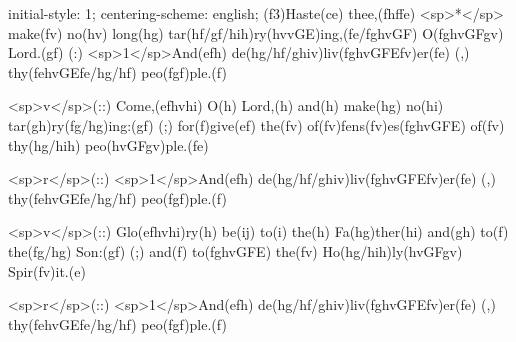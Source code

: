 initial-style: 1;
centering-scheme: english;
(f3)Haste(ce) thee,(fhffe) <sp>*</sp> make(fv) no(hv) long(hg) tar(hf/gf/hih)ry(hvvGE)ing,(fe/fghvGF) O(fghvGFgv) Lord.(gf) (:) <sp>1</sp>And(efh) de(hg/hf/ghiv)liv(fghvGFEfv)er(fe) (,) thy(fehvGEfe/hg/hf) peo(fgf)ple.(f) 

<sp>v</sp>(::) Come,(efhvhi) O(h) Lord,(h) and(h) make(hg) no(hi) tar(gh)ry(fg/hg)ing:(gf) (;) for(f)give(ef) the(fv) of(fv)fens(fv)es(fghvGFE) of(fv) thy(hg/hih) peo(hvGFgv)ple.(fe) 

<sp>r</sp>(::) <sp>1</sp>And(efh) de(hg/hf/ghiv)liv(fghvGFEfv)er(fe) (,) thy(fehvGEfe/hg/hf) peo(fgf)ple.(f) 

<sp>v</sp>(::) Glo(efhvhi)ry(h) be(ij) to(i) the(h) Fa(hg)ther(hi) and(gh) to(f) the(fg/hg) Son:(gf) (;) and(f) to(fghvGFE) the(fv) Ho(hg/hih)ly(hvGFgv) Spir(fv)it.(e)

<sp>r</sp>(::) <sp>1</sp>And(efh) de(hg/hf/ghiv)liv(fghvGFEfv)er(fe) (,) thy(fehvGEfe/hg/hf) peo(fgf)ple.(f) 